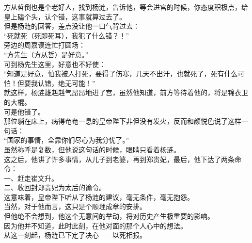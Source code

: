 \begin{multicols}{\theparacolNo}
方从哲倒也是个老好人，找到杨涟，告诉他，等会进宫的时候，你态度积极点，给皇上磕个头，认个错，这事就算过去了。\\

但是杨涟的回答，差点没让他一口气背过去：\\

“死就死（死即死耳），我犯了什么错？！”\\

旁边的周嘉谟连忙打圆场：\\

“方先生（方从哲）是好意。”\\

可到杨先生这里，好意也不好使：\\

“知道是好意，怕我被人打死，要得了伤寒，几天不出汗，也就死了，死有什么可怕！但要我认错，绝无可能！”\\

就这样，杨涟雄赳赳气昂昂地进了宫，虽然他知道，前方等待着他的，将是锦衣卫的大棍。\\

可是他错了。\\

那位躺在床上，病得奄奄一息的皇帝陛下非但没有发火，反而和颜悦色说了这样一句话：\\

“国家的事情，全靠你们尽心为我分忧了。”\\

虽然称呼是复数，但他说这句话的时候，眼睛只看着杨涟。\\

这之后，他讲了许多事情，从儿子到老婆，再到郑贵妃，最后，他下达了两条命令：\\

一、赶走崔文升。\\

二、收回封郑贵妃为太后的谕令。\\

这意味着，皇帝陛下听从了杨涟的建议，毫无条件，毫无抱怨。\\

当然，对于他而言，这只是个顺理成章的安排。\\

但他绝不会想到，他这个无意间的举动，将对历史产生极重要的影响。\\

因为他并不知道，此时此刻，在他对面的那个人心中的想法。\\

从这一刻起，杨涟已下定了决心——以死相报。\\


\end{multicols}
